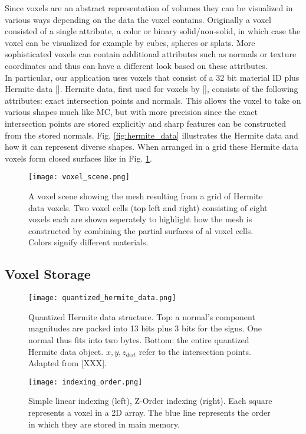 Since voxels are an abstract representation of volumes they can be visualized in various ways depending on the data the voxel contains.
Originally a voxel consisted of a single attribute, a color or binary solid/non-solid, in which case the voxel can be visualized for example by cubes, spheres or splats.
More sophisticated voxels can contain additional attributes such as normals or texture coordinates and thus can have a different look based on these attributes.\\
In particular, our application uses voxels that consist of a 32 bit material ID plus Hermite data []. Hermite data, first used for voxels by [],
consists of the following attributes: exact intersection points and normals. This allows the voxel to take on various shapes much like MC, but with more precision since the exact intersection points are stored explicitly and
sharp features can be constructed from the stored normals. Fig. \ref{fig:hermite_data} illustrates the Hermite data and how it can represent diverse shapes. When arranged in a grid these Hermite data voxels form closed surfaces
like in Fig. \ref{fig:voxel_scene}.

\begin{figure}
\centering
\captionsetup{width=0.8\textwidth}
\texttt{[image: voxel\_scene.png]}
\caption{A voxel scene showing the mesh resulting from a grid of Hermite data voxels. Two voxel cells (top left and right) consisting of eight voxels each are shown seperately to highlight how
the mesh is constructed by combining the partial surfaces of al voxel cells. Colors signify different materials.}
\label{fig:voxel_scene}
\end{figure}

\subsection{Voxel Storage}

\begin{figure}[!htb]
\texttt{[image: quantized\_hermite\_data.png]}
\caption{Quantized Hermite data structure. Top: a normal's component magnitudes are packed into 13 bits plus 3 bits for the signs. One normal thus fits into two bytes. Bottom: the entire quantized Hermite data object. $x,y,z_{dist}$ refer to the intersection points. Adapted from [XXX].}
\label{fig:quantized_hermite_data}
\endminipage\hfill
{}
\vspace*{10mm}
\texttt{[image: indexing\_order.png]}
\vspace*{4mm}
\caption{Simple linear indexing (left), Z-Order indexing (right). Each square represents a voxel in a 2D array. The blue line represents the order in which they are stored in main memory.}
\label{fig:indexing_order}
\endminipage\hfill
\end{figure}


